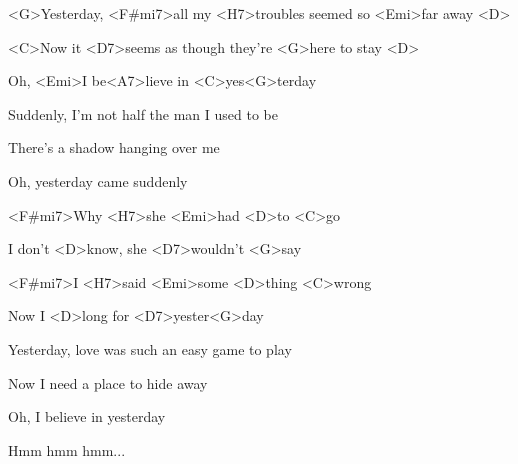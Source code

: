 

\zs
<G>Yesterday, <F#mi7>all my <H7>troubles seemed so <Emi>far away <D>

<C>Now it <D7>seems as though they're <G>here to stay <D>

Oh, <Emi>I be<A7>lieve in <C>yes<G>terday
\ks

\zs
Suddenly, I'm not half the man I used to be

There's a shadow hanging over me

Oh, yesterday came suddenly
\ks

\zr
<F#mi7>Why <H7>she <Emi>had <D>to <C>go

I don't <D>know, she <D7>wouldn't <G>say

<F#mi7>I <H7>said <Emi>some <D>thing <C>wrong

Now I <D>long for <D7>yester<G>day
\kr

\zs
Yesterday, love was such an easy game to play

Now I need a place to hide away

Oh, I believe in yesterday

Hmm hmm hmm...
\ks

\kp



















